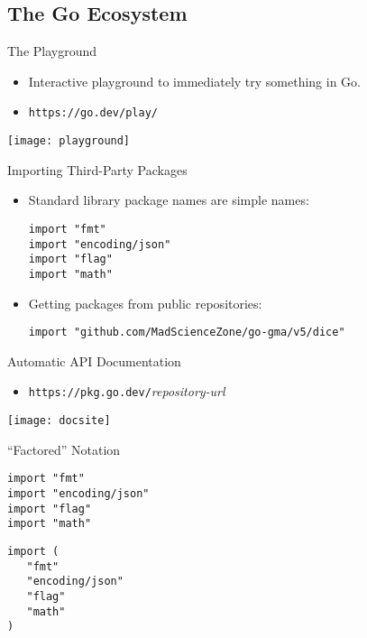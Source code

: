 \documentclass[pdf]{beamer}
\newcommand\z[1]{\texttt{#1}}
\begin{document}
\subsection{The Go Ecosystem}
\begin{frame}{The Playground}
	\begin{itemize}
		\item Interactive playground to immediately try something in Go.
		\item \z{https://go.dev/play/}
	\end{itemize}
	\begin{center}
		\texttt{[image: playground]}
	\end{center}
\end{frame}
\begin{frame}[fragile]{Importing Third-Party Packages}
	\begin{itemize}
		\item Standard library package names are simple names:
			\begin{lstlisting}
import "fmt"
import "encoding/json"
import "flag"
import "math"
\end{lstlisting}
\pause
		\item Getting packages from public repositories:
\begin{lstlisting}
import "github.com/MadScienceZone/go-gma/v5/dice"
\end{lstlisting}
	\end{itemize}
	\vfill
	\strut
\end{frame}
\begin{frame}{Automatic API Documentation}
\begin{itemize}
\item\z{https://pkg.go.dev/}\emph{repository-url}
\end{itemize}
	\begin{center}
		\texttt{[image: docsite]}
	\end{center}
\end{frame}

\begin{frame}[fragile]{``Factored'' Notation}
\begin{lstlisting}
import "fmt"
import "encoding/json"
import "flag"
import "math"
\end{lstlisting}
\pause
\begin{lstlisting}
import (
   "fmt"
   "encoding/json"
   "flag"
   "math"
)
\end{lstlisting}
\end{frame}
\end{document}
